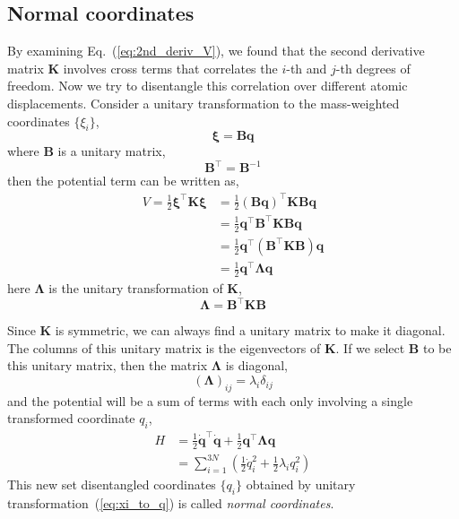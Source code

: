 \documentclass[a4paper,notitlepage,preprint]{revtex4-1}
\newcommand\mbf{\mathbf}
\begin{document}
\subsection{Normal coordinates}
By examining Eq.~(\ref{eq:2nd_deriv_V}), we found that the second derivative matrix $\mbf{K}$ involves cross terms that correlates the $i$-th and $j$-th degrees of freedom. Now we try to disentangle this correlation over different atomic displacements. Consider a unitary transformation to the mass-weighted coordinates $\{\xi_i\}$,
\begin{equation}
	\bm{\xi} = \mbf{B}\mbf{q}
	\label{eq:xi_to_q}
\end{equation}
\noindent where $\mbf{B}$ is a unitary matrix,
\begin{equation}
	\mbf{B}^\top = \mbf{B}^{-1}
	\label{eq:B}
\end{equation}
\noindent then the potential term can be written as,
\begin{equation}
	\begin{split}
	V = \frac{1}{2} \bm{\xi}^\top \mbf{K}\bm{\xi} &= \frac{1}{2} (\mbf{Bq})^\top \mbf{KBq} \\
	&= \frac{1}{2}\mbf{q}^\top\mbf{B}^\top \mbf{KBq} \\
	&= \frac{1}{2}\mbf{q}^\top(\mbf{B}^\top\mbf{KB})\mbf{q} \\
	&= \frac{1}{2}\mbf{q}^\top\bm{\Lambda}\mbf{q} 
	\end{split}
	\label{eq:V_Bq}
\end{equation}
\noindent here $\bm\Lambda$ is the unitary transformation of $\mbf{K}$,
\begin{equation}
	\bm\Lambda = \mbf{B}^\top\mbf{KB}
	\label{eq:Lambda}
\end{equation}

Since $\mbf{K}$ is symmetric, we can always find a unitary matrix to make it diagonal. The columns of this unitary matrix is the eigenvectors of $\mbf{K}$. If we select $\mbf{B}$ to be this unitary matrix, then the matrix $\bm\Lambda$ is diagonal,
\begin{equation}
	(\bm\Lambda)_{ij} = \lambda_i\delta_{ij}
	\label{eq:lambda}
\end{equation}
\noindent and the potential will be a sum of terms with each only involving a single transformed coordinate $q_i$,
\begin{equation}
	\begin{split}
	H &= \frac{1}{2}\dot{\mbf{q}}^\top\dot{\mbf{q}} + \frac{1}{2}\mbf{q}^\top \bm{\Lambda}\mbf{q} \\
	&= \sum_{i=1}^{3N} \left( \frac{1}{2} \dot{q}_i^2 + \frac{1}{2}\lambda_i q_i^2\right)
	\end{split}
	\label{eq:Hmq}
\end{equation} 
This new set disentangled coordinates $\{q_i\}$ obtained by unitary transformation~(\ref{eq:xi_to_q}) is called {\em normal coordinates}.
\end{document}

